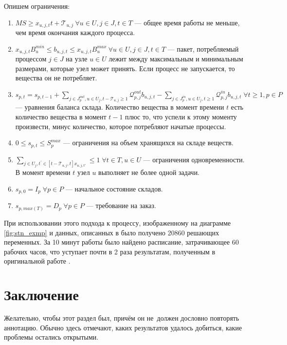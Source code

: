\documentclass[12pt, twoside]{article}
\theoremstyle{definition}
\newcommand{\Tau}{\mathcal{T}}
\begin{document}
Опишем ограничения:

\begin{enumerate}
	\item $MS \geq x_{u, j, t}t + \Tau_{u, j} \: \forall u \in U, j \in J, t \in T$ --- общее время работы не меньше, чем время окончания каждого процесса.
	\item $x_{u, j, t}B^{min}_u \leq b_{u, j, t} \leq x_{u, j, t}B^{max}_u \: \forall u \in U, j \in J, t \in T$ --- пакет, потребляемый процессом $j \in J$ на узле $u \in U$ лежит между максимальным и минимальным размерами, которые узел может принять. Если процесс не запускается, то вещества он не потребляет.
	\item $s_{p, t} = s_{p, t-1} + \displaystyle\sum_{j \in J^{out}_p, u \in U_j, t - \Tau_{u, j} \geq 1} \mathcal{Q}^{out}_{p, j}b_{u, j, t} - \displaystyle\sum_{j \in J^{in}_p, u \in U_j, t \geq 1} \mathcal{Q}^{in}_{p, j}b_{u, j, t} \; \forall t \geq 1, p \in P$ --- уравнения баланса склада. Количество вещества в момент времени $t$ есть количество вещества в момент $t-1$ плюс то, что успели к этому моменту произвести, минус количество, которое потребляют начатые процессы.
	\item $0 \leq s_{p, t} \leq S^{max}_p$ --- ограничения на объем хранящихся на складе веществ.
	\item $\displaystyle\sum_{j \in U_j, t^{'} \in [t-\Tau_{u, j}, t] x_{u, j, t'}} \leq 1 \; \forall t \in T, u \in U$ --- ограничения одновременности. В момент времени $t$ узел $u$ выполняет не более одной задачи.
	\item $s_{p, 0} = I_p \; \forall p \in P$ --- начальное состояние складов.
	\item $s_{p, max(T)} = D_p \; \forall p \in P$ --- требование на заказ.
\end{enumerate}

При использовании этого подхода к процессу, изображенному на диаграмме \ref{fig:stn_exmp} и данных, описанных в \cite{discretetime} было получено 20860 решающих переменных. За 10 минут работы было найдено расписание, затрачивающее 60 рабочих часов, что уступает почти в 2 раза результатам, полученным в оригинальной работе \cite{discretetime}.
\section{Заключение}
Желательно, чтобы этот раздел был, причём он не~должен дословно повторять аннотацию.
Обычно здесь отмечают, каких результатов удалось добиться, какие проблемы остались открытыми.
\end{document}
